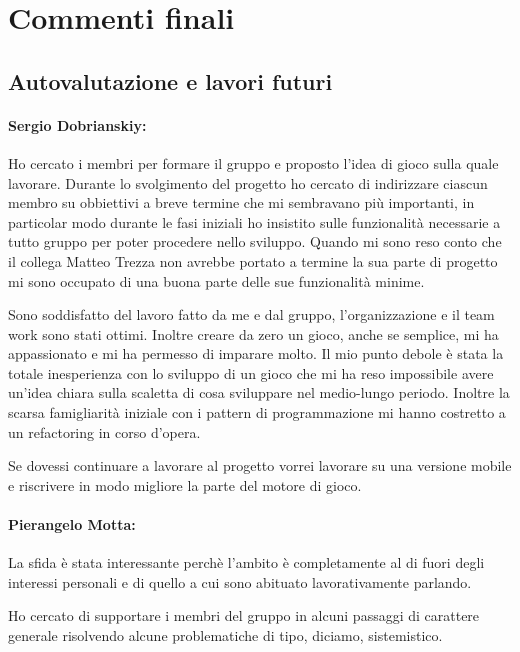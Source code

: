 \documentclass[a4paper,12pt]{report}
\begin{document}
\chapter{Commenti finali}

\section{Autovalutazione e lavori futuri}
\subsubsection*{Sergio Dobrianskiy:}

Ho  cercato i membri per formare il gruppo e proposto l'idea di gioco sulla quale lavorare.
Durante lo svolgimento del progetto ho cercato di indirizzare ciascun membro su obbiettivi a breve termine che mi sembravano più importanti, in particolar modo durante le fasi iniziali ho insistito sulle funzionalità necessarie a tutto gruppo per poter procedere nello sviluppo. 
Quando mi sono reso conto che il collega Matteo Trezza non avrebbe portato a termine la sua parte di progetto mi sono occupato di una buona parte delle sue funzionalità minime.

Sono soddisfatto del lavoro fatto da me e dal gruppo, l'organizzazione e il team work sono stati ottimi. Inoltre creare da zero un gioco, anche se semplice, mi ha appassionato e mi ha permesso di imparare molto.
Il mio punto debole è stata la totale inesperienza con lo sviluppo di un gioco che mi ha reso impossibile avere un'idea chiara sulla scaletta di cosa sviluppare nel medio-lungo periodo. Inoltre la scarsa famigliarità iniziale con i pattern di programmazione mi hanno costretto a un refactoring in corso d'opera. 

Se dovessi continuare a lavorare al progetto vorrei lavorare su una versione mobile e riscrivere in modo migliore la parte del motore di gioco.

\subsubsection*{Pierangelo Motta:}

La sfida è stata interessante perchè l'ambito è completamente al di fuori degli interessi personali e di quello a cui sono abituato lavorativamente parlando.

Ho cercato di supportare i membri del gruppo in alcuni passaggi di carattere generale risolvendo alcune problematiche di tipo, diciamo, sistemistico.
\end{document}
